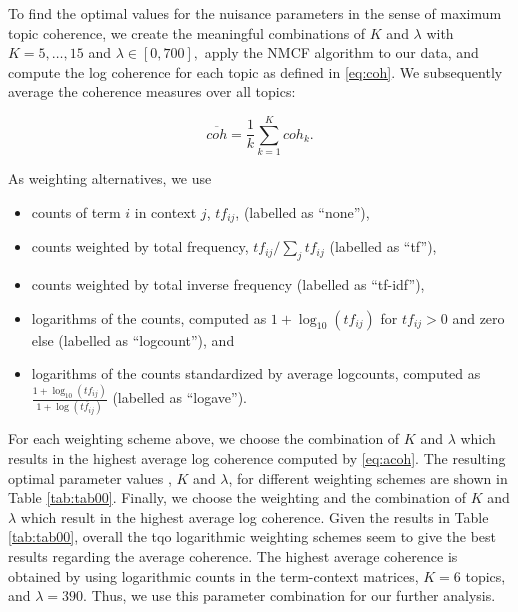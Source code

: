 \documentclass[
]{article}
\providecommand{\tightlist}{%
  \setlength{\itemsep}{0pt}\setlength{\parskip}{0pt}}
\begin{document}
To find the optimal values for the nuisance parameters in the sense of maximum topic coherence, we create the meaningful combinations of \(K\) and \(\lambda\) with \(K=5,\ldots,15\) and \(\lambda\in[0,700],\) apply the NMCF algorithm to our data, and compute the log coherence for each topic as defined in \eqref{eq:coh}. We subsequently average the coherence measures over all topics:

\begin{equation}
\overline{coh}=\frac 1k \sum_{k=1}^Kcoh_k.\label{eq:acoh}
\end{equation}

As weighting alternatives, we use

\begin{itemize}
\tightlist
\item
  counts of term \(i\) in context \(j\), \(tf_{ij}\), (labelled as ``none''),
\item
  counts weighted by total frequency, \(tf_{ij}/\sum_{j}tf_{ij}\) (labelled as ``tf''),
\item
  counts weighted by total inverse frequency (labelled as ``tf-idf''),
\item
  logarithms of the counts, computed as \(1+\log_{10}(tf_{ij})\) for \(tf_{ij}>0\) and zero else (labelled as ``logcount''), and
\item
  logarithms of the counts standardized by average logcounts, computed as \(\frac{1+\log_{10}(tf_{ij})}{1+\log\left(\overline{tf_{ij}}\right)}\) (labelled as ``logave'').
\end{itemize}

For each weighting scheme above, we choose the combination of \(K\) and \(\lambda\) which results in the highest average log coherence computed by \eqref{eq:acoh}.
The resulting optimal parameter values , \(K\) and \(\lambda\), for different weighting schemes are shown in Table \ref{tab:tab00}. Finally, we choose the weighting and the combination of \(K\) and \(\lambda\) which result in the highest average log coherence.
Given the results in Table \ref{tab:tab00}, overall the tqo logarithmic weighting schemes seem to give the best results regarding the average coherence. The highest average coherence is obtained by using logarithmic counts in the term-context matrices, \(K=6\) topics, and \(\lambda=390.\) Thus, we use this parameter combination for our further analysis.
\end{document}
